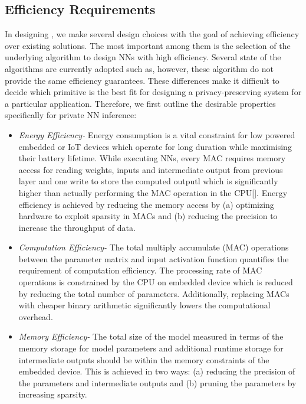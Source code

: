 \subsection{Efficiency Requirements}

In designing \method, we make several design choices with the goal of achieving efficiency over existing solutions.
The most important among them is the selection of the underlying algorithm to design NNs with high efficiency.
Several state of the algorithms are currently adopted such as, however, these algorithm do not provide the same efficiency guarantees.
These differences make it difficult to decide which primitive is the best fit for designing a privacy-preserving system for a particular application.
Therefore, we first outline the desirable properties specifically for private NN inference:

\begin{itemize}[leftmargin=*]
\item {\em Energy Efficiency-} Energy consumption is a vital constraint for low powered embedded or IoT devices which operate for long duration while maximising their battery lifetime.
While executing NNs, every MAC requires memory access for reading weights, inputs and intermediate output from previous layer and one write to store the computed outputl which is significantly higher than actually performing the MAC operation in the CPU[].
Energy efficiency is achieved by reducing the memory access by (a) optimizing hardware to exploit sparsity in MACs and (b) reducing the precision to increase the throughput of data.

\item {\em Computation Efficiency-} The total multiply accumulate (MAC) operations between the parameter matrix and input activation function quantifies the requirement of computation efficiency.
The processing rate of MAC operations is constrained by the CPU on embedded device which is reduced by reducing the total number of parameters.
Additionally, replacing MACs with cheaper binary arithmetic significantly lowers the computational overhead.

\item {\em Memory Efficiency-} The total size of the model measured in terms of the memory storage for model parameters and additional runtime storage for intermediate outputs should be within the memory constraints of the embedded device.
This is achieved in two ways: (a) reducing the precision of the parameters and intermediate outputs and (b) pruning the parameters by increasing sparsity.
\end{itemize}


